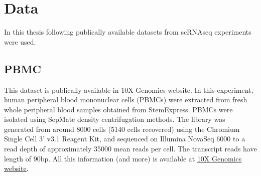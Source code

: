 \section{Data}

In this thesis following publically available datasets from scRNAseq experiments were used.

\subsection{PBMC}

This dataset is publically available in 10X Genomics website.
In this experiment, human peripheral blood mononuclear cells (PBMCs) were extracted from fresh whole peripheral blood samples obtained from StemExpress. PBMCs were isolated using SepMate density centrifugation methods.
The library was generated from around 8000 cells (5140 cells recovered) using the Chromium Single Cell 3' v3.1 Reagent Kit,
and sequenced on Illumina NovaSeq 6000 to a read depth of approximately 35000 mean reads per cell.
The transcript reads have length of 90bp.
All this information (and more) is available at
\href{https://www.10xgenomics.com/datasets/5k-human-pbmcs-3-v3-1-chromium-controller-3-1-standard}{10X Genomics website}.
